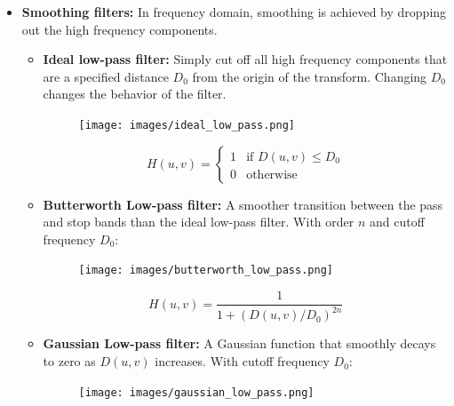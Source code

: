 \begin{itemize}
  \item \textbf{Smoothing filters:} In frequency domain, smoothing is
    achieved by dropping out the high frequency components.
    \begin{itemize}
      \item \textbf{Ideal low-pass filter:} Simply cut off all high
        frequency components that are a specified distance $D_0$ from the
        origin of the transform. Changing $D_0$ changes the behavior
        of the filter.

        \begin{minipage}{\linewidth}
          \begin{figure}[H]
            \centering
            \texttt{[image: images/ideal\_low\_pass.png]}
          \end{figure}
        \end{minipage}

        \begin{equation*}
          H(u, v) =
          \begin{cases}
            1 & \text{if } D(u, v) \leq D_0 \\
            0 & \text{otherwise}
          \end{cases}
        \end{equation*}

      \item \textbf{Butterworth Low-pass filter:} A smoother
        transition between the pass and stop bands than the ideal low-pass
        filter. With order $n$ and cutoff frequency $D_0$:

        \begin{minipage}{\linewidth}
          \begin{figure}[H]
            \centering
            \texttt{[image: images/butterworth\_low\_pass.png]}
          \end{figure}
        \end{minipage}

        \begin{equation*}
          H(u, v) = \frac{1}{1 + (D(u, v)/D_0)^{2n}}
        \end{equation*}

      \item \textbf{Gaussian Low-pass filter:} A Gaussian function
        that smoothly decays to zero as $D(u, v)$ increases. With cutoff
        frequency $D_0$:

        \begin{minipage}{\linewidth}
          \begin{figure}[H]
            \centering
            \texttt{[image: images/gaussian\_low\_pass.png]}
          \end{figure}
        \end{minipage}


\end{itemize}
\end{itemize}
